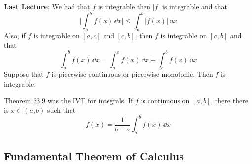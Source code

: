 \documentclass{report}
\begin{document}
\textbf{Last Lecture}: We had that $f$ is integrable then $\lvert f \rvert$ is integrable and that
    \begin{equation*}
        \lvert \int_{a}^{b} f(x) \, \dd{x}  \rvert \leq  \int_{ a}^{b} \lvert  f(x) \rvert \, \dd{ x} 
    \end{equation*}
Also, if $f$ is integrable on $[a, c]$ and $[c, b]$, then $f$ is integrable on $[a, b]$ and that 
    \begin{equation*}
        \int_{a}^{b} f(x) \, \dd{x}  = \int_{a}^{c} f(x) \, \dd{x}  + \int_{c}^{b} f(x) \, \dd{x} 
    \end{equation*}
Suppose that $f$ is piecewise continuous or piecewise monotonic. Then $f$ is integrable.

Theorem $33.9$ was the IVT for integrals. If $f$ is continuous on $[a, b]$, there there is $x \in ( a, b)$ such that 
    \begin{equation*}
        f(x) = \dfrac{1}{b - a}\int_{a}^{b} f(x) \, \dd{x} 
    \end{equation*}

\begin{topic}
    \section{Fundamental Theorem of Calculus}
\end{topic}
\end{document}

